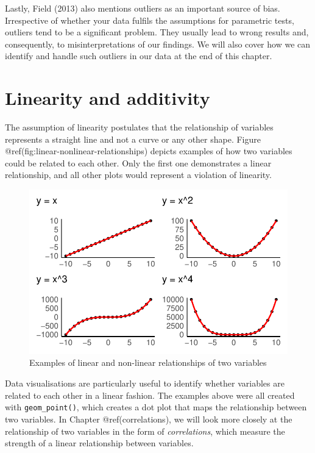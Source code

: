 \documentclass[
  letterpaper,
]{krantz}
\begin{document}
Lastly, Field (2013) also mentions outliers as an important source of
bias. Irrespective of whether your data fulfils the assumptions for
parametric tests, outliers tend to be a significant problem. They
usually lead to wrong results and, consequently, to misinterpretations
of our findings. We will also cover how we can identify and handle such
outliers in our data at the end of this chapter.

\section{Linearity and additivity}\label{additivity-and-linearity}

The assumption of linearity postulates that the relationship of
variables represents a straight line and not a curve or any other shape.
Figure @ref(fig:linear-nonlinear-relationships) depicts examples of how
two variables could be related to each other. Only the first one
demonstrates a linear relationship, and all other plots would represent
a violation of linearity.

\begin{figure}[H]

{\centering \includegraphics{09_sources_of_bias_files/figure-pdf/linear-nonlinear-relationships-1.pdf}

}

\caption{Examples of linear and non-linear relationships of two
variables}

\end{figure}%

Data visualisations are particularly useful to identify whether
variables are related to each other in a linear fashion. The examples
above were all created with \texttt{geom\_point()}, which creates a dot
plot that maps the relationship between two variables. In Chapter
@ref(correlations), we will look more closely at the relationship of two
variables in the form of \emph{correlations}, which measure the strength
of a linear relationship between variables.
\end{document}
